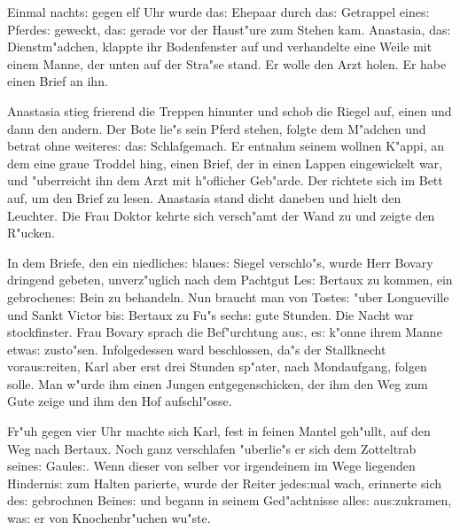 \documentclass[oneside,12pt]{book}
\newcommand{\s}{s:}%
\begin{document}
\newpage\begin{center}
{\large \so{Zweite{\s} Kapitel}}\bigskip\bigskip
\end{center}

Einmal nacht{\s} gegen elf Uhr wurde da{\s} Ehepaar durch da{\s}
Getrappel eine{\s} Pferde{\s} geweckt, da{\s} gerade vor der
Haust"ure zum Stehen kam. Anastasia, da{\s} Dienstm"adchen,
klappte ihr Bodenfenster auf und verhandelte eine Weile mit einem
Manne, der unten auf der Stra"se stand. Er wolle den Arzt holen.
Er habe einen Brief an ihn.

Anastasia stieg frierend die Treppen hinunter und schob die Riegel
auf, einen und dann den andern. Der Bote lie"s sein Pferd stehen,
folgte dem M"adchen und betrat ohne weitere{\s} da{\s}
Schlafgemach. Er entnahm seinem wollnen K"appi, an dem eine graue
Troddel hing, einen Brief, der in einen Lappen eingewickelt war,
und "uberreicht ihn dem Arzt mit h"oflicher Geb"arde. Der richtete
sich im Bett auf, um den Brief zu lesen. Anastasia stand dicht
daneben und hielt den Leuchter. Die Frau Doktor kehrte sich
versch"amt der Wand zu und zeigte den R"ucken.

In dem Briefe, den ein niedliche{\s} blaue{\s} Siegel verschlo"s,
wurde Herr Bovary dringend gebeten, unverz"uglich nach dem
Pachtgut Le{\s} Bertaux zu kommen, ein gebrochene{\s} Bein zu
behandeln. Nun braucht man von Toste{\s} "uber Longueville und
Sankt Victor bi{\s} Bertaux zu Fu"s sech{\s} gute Stunden. Die
Nacht war stockfinster. Frau Bovary sprach die Bef"urchtung
au{\s}, e{\s} k"onne ihrem Manne etwa{\s} zusto"sen. Infolgedessen
ward beschlossen, da"s der Stallknecht vorau{\s}reiten, Karl aber
erst drei Stunden sp"ater, nach Mondaufgang, folgen solle. Man
w"urde ihm einen Jungen entgegenschicken, der ihm den Weg zum Gute
zeige und ihm den Hof aufschl"osse.

Fr"uh gegen vier Uhr machte sich Karl, fest in feinen Mantel
geh"ullt, auf den Weg nach Bertaux. Noch ganz verschlafen
"uberlie"s er sich dem Zotteltrab seine{\s} Gaule{\s}. Wenn dieser
von selber vor irgendeinem im Wege liegenden Hinderni{\s} zum
Halten parierte, wurde der Reiter jede{\s}mal wach, erinnerte sich
de{\s} gebrochnen Beine{\s} und begann in seinem Ged"achtnisse
alle{\s} au{\s}zukramen, wa{\s} er von Knochenbr"uchen wu"ste.
\end{document}
